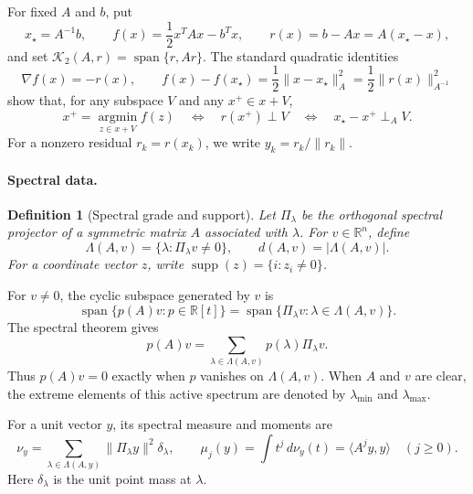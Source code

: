 \documentclass[11pt]{article}
\newtheorem{definition}[lemma]{Definition}
\begin{document}
For fixed \(A\) and \(b\), put
\[
 x_\star=A^{-1}b,\qquad
 f(x)=\frac12x^TAx-b^Tx,\qquad
 r(x)=b-Ax=A(x_\star-x),
\]
and set \(\mathcal K_2(A,r)=\operatorname{span}\{r,Ar\}\).  The standard
quadratic identities
\[
 \nabla f(x)=-r(x),\qquad
 f(x)-f(x_\star)
 =\frac12\lVert x-x_\star\rVert_A^2
 =\frac12\lVert r(x)\rVert_{A^{-1}}^2
\]
show that, for any subspace \(V\) and any \(x^+\in x+V\),
\[
 x^+=\operatorname*{argmin}_{z\in x+V}f(z)
 \quad\Longleftrightarrow\quad
 r(x^+)\perp V
 \quad\Longleftrightarrow\quad
 x_\star-x^+\perp_A V.
\]
For a nonzero residual \(r_k=r(x_k)\), we write
\(y_k=r_k/\lVert r_k\rVert\).

\paragraph{Spectral data.}
\begin{definition}[Spectral grade and support]
\label{def:grade-support}
Let \(\Pi_\lambda\) be the orthogonal spectral projector of a symmetric
matrix \(A\) associated with \(\lambda\).  For \(v\in\mathbb R^n\), define
\[
 \Lambda(A,v)=\{\lambda:\Pi_\lambda v\neq0\},\qquad
 d(A,v)=\lvert\Lambda(A,v)\rvert.
\]
For a coordinate vector \(z\), write
\(\operatorname{supp}(z)=\{i:z_i\neq0\}\).
\end{definition}

For \(v\neq0\), the cyclic subspace generated by \(v\) is
\[
 \operatorname{span}\{p(A)v:p\in\mathbb R[t]\}
 =\operatorname{span}\{\Pi_\lambda v:\lambda\in\Lambda(A,v)\}.
\]
The spectral theorem gives
\[
 p(A)v=\sum_{\lambda\in\Lambda(A,v)}
             p(\lambda)\Pi_\lambda v.
\]
Thus \(p(A)v=0\) exactly when \(p\) vanishes on
\(\Lambda(A,v)\).  When \(A\) and \(v\) are clear, the extreme elements
of this active spectrum are denoted by
\(\lambda_{\min}\) and \(\lambda_{\max}\).

For a unit vector \(y\), its spectral measure and moments are
\[
 \nu_y=\sum_{\lambda\in\Lambda(A,y)}
          \lVert\Pi_\lambda y\rVert^2\delta_\lambda,\qquad
 \mu_j(y)=\int t^j\,d\nu_y(t)
         =\langle A^jy,y\rangle\quad(j\geq0).
\]
Here \(\delta_\lambda\) is the unit point mass at \(\lambda\).
\end{document}
